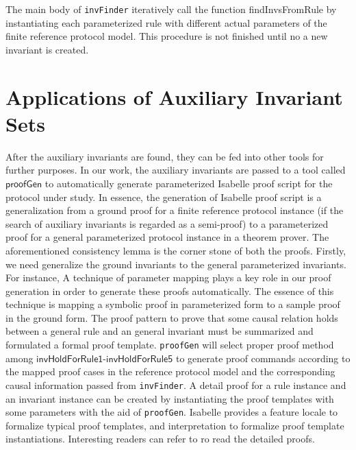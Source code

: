 \documentclass{llncs}
\begin{document}
The main body of \texttt{invFinder}   iteratively call the function
{\sf findInvsFromRule}  by instantiating each   parameterized rule
with different actual parameters of the finite reference protocol
model. This procedure is not finished until no a new invariant is
created.
\section{Applications of Auxiliary Invariant Sets}
 After the auxiliary invariants are found, they can be fed into other
tools for further purposes. In our work, the auxiliary invariants
are passed to a tool called $\mathsf{proofGen}$ to automatically
generate parameterized Isabelle proof script for the protocol under
study. In essence, the generation of Isabelle proof script is a
generalization from a ground proof for a finite reference protocol
instance (if the search of auxiliary invariants is regarded as a
semi-proof) to a parameterized proof for a general parameterized
protocol instance in a theorem prover. The aforementioned
consistency lemma is the corner stone of both the proofs. Firstly,
we need generalize the ground invariants to the general
parameterized invariants. For instance,
 A technique of parameter mapping plays a key role in our proof generation in order to
generate these proofs automatically. The essence of this technique
is mapping a symbolic proof in parameterized form to a sample proof
in the ground form. The proof pattern to prove that some causal
relation holds between a general rule and an general invariant must
be summarized and formulated a formal proof template.
\texttt{proofGen} will select proper proof method among
$\mathsf{invHoldForRule1}$-$\mathsf{invHoldForRule5}$ to generate
proof commands according to the mapped proof cases in the reference
protocol model and the corresponding causal information passed from
\texttt{invFinder}.  A detail proof for a rule instance and an
invariant instance can be created by instantiating the proof
templates with some parameters with the aid of \texttt{proofGen}.
Isabelle provides a feature {\sf locale} to formalize typical proof
templates, and {\sf interpretation} to formalize proof template
instantiations. Interesting readers can refer to \cite{} ro read the
detailed proofs.
\end{document}
